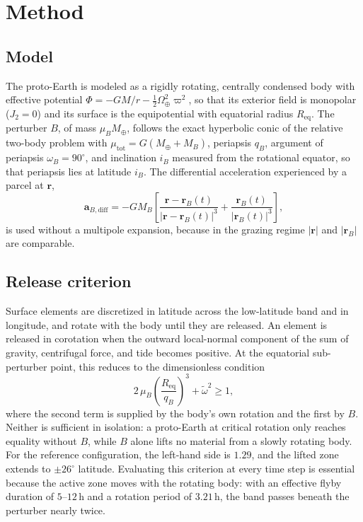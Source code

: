 \documentclass[11pt,a4paper]{article}
\begin{document}
\section{Method}

\subsection{Model}
The proto-Earth is modeled as a rigidly rotating, centrally condensed body with effective potential $\Phi=-GM/r-\frac{1}{2}\Omega_\oplus^2\varpi^2$, so that its exterior field is monopolar ($J_2=0$) and its surface is the equipotential with equatorial radius $R_{\mathrm{eq}}$. The perturber $B$, of mass $\mu_B M_\oplus$, follows the exact hyperbolic conic of the relative two-body problem with $\mu_{\mathrm{tot}}=G(M_\oplus+M_B)$, periapsis $q_B$, argument of periapsis $\omega_B=90^\circ$, and inclination $i_B$ measured from the rotational equator, so that periapsis lies at latitude $i_B$. The differential acceleration experienced by a parcel at $\mathbf{r}$,
\begin{equation}
\mathbf{a}_{B,\mathrm{diff}} = -G M_B \left[ \frac{\mathbf{r} - \mathbf{r}_B(t)}{|\mathbf{r} - \mathbf{r}_B(t)|^3} + \frac{\mathbf{r}_B(t)}{|\mathbf{r}_B(t)|^3} \right],
\end{equation}
is used without a multipole expansion, because in the grazing regime $|\mathbf{r}|$ and $|\mathbf{r}_B|$ are comparable.

\subsection{Release criterion}
Surface elements are discretized in latitude across the low-latitude band and in longitude, and rotate with the body until they are released. An element is released in corotation when the outward local-normal component of the sum of gravity, centrifugal force, and tide becomes positive. At the equatorial sub-perturber point, this reduces to the dimensionless condition
\begin{equation}
2\,\mu_B \left(\frac{R_{\mathrm{eq}}}{q_B}\right)^3 + \tilde{\omega}^2 \ge 1,
\end{equation}
where the second term is supplied by the body's own rotation and the first by $B$. Neither is sufficient in isolation: a proto-Earth at critical rotation only reaches equality without $B$, while $B$ alone lifts no material from a slowly rotating body. For the reference configuration, the left-hand side is $1.29$, and the lifted zone extends to $\pm26^\circ$ latitude. Evaluating this criterion at every time step is essential because the active zone moves with the rotating body: with an effective flyby duration of $5$--$12\,\mathrm{h}$ and a rotation period of $3.21\,\mathrm{h}$, the band passes beneath the perturber nearly twice.
\end{document}
